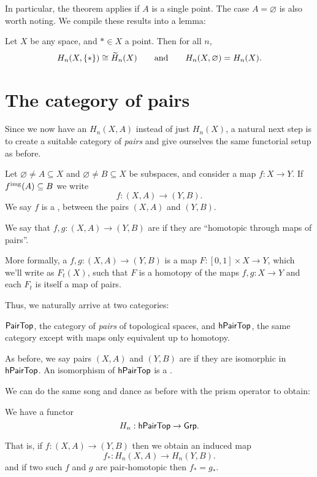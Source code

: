 In particular, the theorem applies if $A$ is a single point.
The case $A = \varnothing$ is also worth noting.
We compile these results into a lemma:
\begin{lemma}
	Let $X$ be any space, and $\ast \in X$ a point. Then for all $n$,
	\[
		H_n(X, \{\ast\}) \cong \widetilde H_n(X)
		\qquad\text{and}\qquad
		H_n(X, \varnothing) = H_n(X).
	\]
\end{lemma}

\section{The category of pairs}
Since we now have an $H_n(X,A)$ instead of just $H_n(X)$,
a natural next step is to create a suitable category of \emph{pairs}
and give ourselves the same functorial setup as before.

\begin{definition}
	Let $\varnothing \neq A \subseteq X$ and $\varnothing \neq B \subseteq X$
	be subspaces, and consider a map $f : X \to Y$.
	If $f^{\text{img}}(A) \subseteq B$ we write
	\[ f : (X,A) \to (Y,B). \]
	We say $f$ is a ,
	between the pairs $(X,A)$ and $(Y,B)$.
\end{definition}
\begin{definition}
	We say that $f,g : (X,A) \to (Y,B)$ are  if they
	are ``homotopic through maps of pairs''.

	More formally, a 
	$f, g : (X,A) \to (Y,B)$ is a map $F : [0,1] \times X \to Y$,
	which we'll write as $F_t(X)$, such that
	$F$ is a homotopy of the maps $f,g : X \to Y$
	and each $F_t$ is itself a map of pairs.
\end{definition}
Thus, we naturally arrive at two categories:
\begin{itemize}
	\ii $\mathsf{PairTop}$, the category of \emph{pairs} of
	topological spaces, and
	\ii $\mathsf{hPairTop}$, the same category except
	with maps only equivalent up to homotopy.
\end{itemize}
\begin{definition}
	As before, we say pairs $(X,A)$ and $(Y,B)$ are
	if they are isomorphic in $\mathsf{hPairTop}$.
	An isomorphism of $\mathsf{hPairTop}$ is a
	.
\end{definition}

We can do the same song and dance as before with the prism operator to obtain:
\begin{lemma}
	We have a functor
	\[ H_n : \mathsf{hPairTop} \to \mathsf{Grp}. \]
\end{lemma}
That is, if $f : (X,A) \to (Y,B)$ then we obtain an induced map
\[ f_\ast : H_n(X,A) \to H_n(Y,B). \]
and if two such $f$ and $g$ are pair-homotopic
then $f_\ast = g_\ast$.


